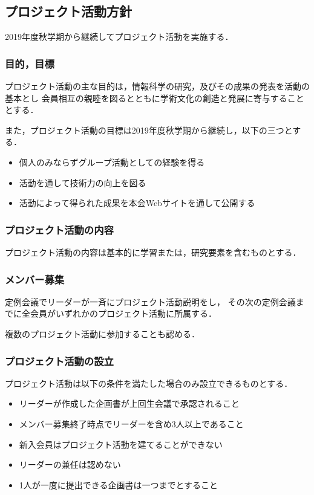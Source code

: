 \subsection*{プロジェクト活動方針}

2019年度秋学期から継続してプロジェクト活動を実施する．

\subsubsection*{目的，目標}
プロジェクト活動の主な目的は，情報科学の研究，及びその成果の発表を活動の基本とし
会員相互の親睦を図るとともに学術文化の創造と発展に寄与することとする．

また，プロジェクト活動の目標は2019年度秋学期から継続し，以下の三つとする．

\begin{itemize}
\item 個人のみならずグループ活動としての経験を得る
\item 活動を通して技術力の向上を図る
\item 活動によって得られた成果を本会Webサイトを通して公開する
\end{itemize}


\subsubsection*{プロジェクト活動の内容}
プロジェクト活動の内容は基本的に学習または，研究要素を含むものとする．

\subsubsection*{メンバー募集}
定例会議でリーダーが一斉にプロジェクト活動説明をし，
その次の定例会議までに全会員がいずれかのプロジェクト活動に所属する．

複数のプロジェクト活動に参加することも認める．

\subsubsection*{プロジェクト活動の設立}
プロジェクト活動は以下の条件を満たした場合のみ設立できるものとする．

\begin{itemize}
\item リーダーが作成した企画書が上回生会議で承認されること
\item メンバー募集終了時点でリーダーを含め3人以上であること
\item 新入会員はプロジェクト活動を建てることができない
\item リーダーの兼任は認めない
\item 1人が一度に提出できる企画書は一つまでとすること
\end{itemize}

